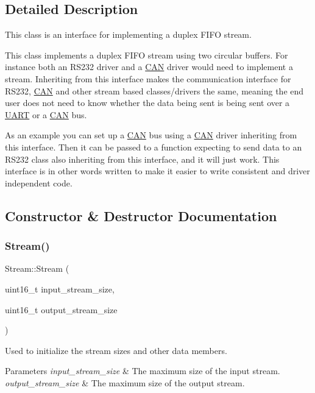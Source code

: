 \subsection{Detailed Description}
This class is an interface for implementing a duplex F\+I\+FO stream.

This class implements a duplex F\+I\+FO stream using two circular buffers. For instance both an R\+S232 driver and a \hyperlink{class_c_a_n}{C\+AN} driver would need to implement a stream. Inheriting from this interface makes the communication interface for R\+S232, \hyperlink{class_c_a_n}{C\+AN} and other stream based classes/drivers the same, meaning the end user does not need to know whether the data being sent is being sent over a \hyperlink{class_u_a_r_t}{U\+A\+RT} or a \hyperlink{class_c_a_n}{C\+AN} bus.

As an example you can set up a \hyperlink{class_c_a_n}{C\+AN} bus using a \hyperlink{class_c_a_n}{C\+AN} driver inheriting from this interface. Then it can be passed to a function expecting to send data to an R\+S232 class also inheriting from this interface, and it will just work. This interface is in other words written to make it easier to write consistent and driver independent code. 

\subsection{Constructor \& Destructor Documentation}
\hypertarget{class_stream_a2b738d6f4d3059de2ae3d444d68663bf}{}\label{class_stream_a2b738d6f4d3059de2ae3d444d68663bf} 
\subsubsection{\texorpdfstring{Stream()}{Stream()}}
{\footnotesize\ttfamily Stream\+::\+Stream (\begin{DoxyParamCaption}\item[{uint16\+\_\+t}]{input\+\_\+stream\+\_\+size,  }\item[{uint16\+\_\+t}]{output\+\_\+stream\+\_\+size }\end{DoxyParamCaption})}

Used to initialize the stream sizes and other data members. 
\begin{DoxyParams}{Parameters}
{\em input\+\_\+stream\+\_\+size} & The maximum size of the input stream. \\
\hline
{\em output\+\_\+stream\+\_\+size} & The maximum size of the output stream. \\
\hline
\end{DoxyParams}


